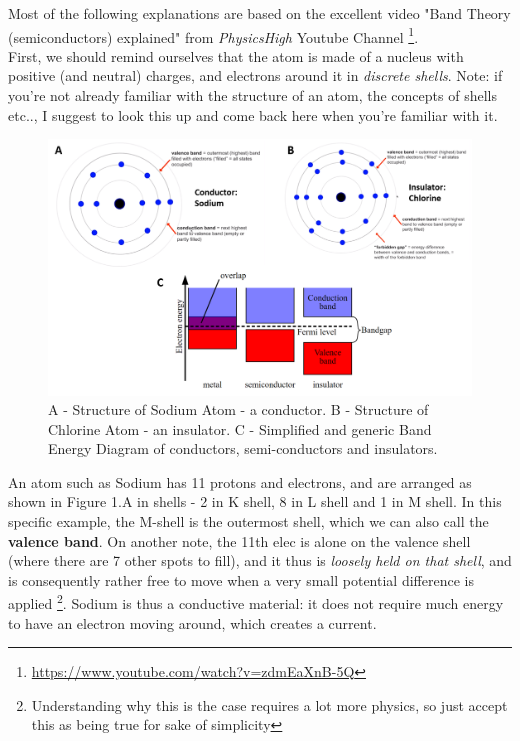 Most of the following explanations are based on the excellent video "Band Theory (semiconductors) explained" from \textit{PhysicsHigh} Youtube Channel \footnote{\url{https://www.youtube.com/watch?v=zdmEaXnB-5Q}}. \\ 

First, we should remind ourselves that the atom is made of a nucleus with positive (and neutral) charges, and electrons around it in \textit{discrete shells}. Note: if you're not already familiar with the structure of an atom, the concepts of shells etc.., I suggest to look this up and come back here when you're familiar with it.

\begin{figure}[H]
    \centering
    \includegraphics[width=0.95\linewidth]{../../Figures/Conduction_Energy_Band_Diagrams.PNG}
    \caption{A - Structure of Sodium Atom - a conductor. B - Structure of Chlorine Atom - an insulator. C - Simplified and generic Band Energy Diagram of conductors, semi-conductors and insulators.}
    \label{fig:Conduction}
\end{figure}

An atom such as Sodium has 11 protons and electrons, and are arranged as shown in Figure 1.A in shells - 2 in K shell, 8 in L shell and 1 in M shell.  In this specific example, the M-shell is the outermost shell, which we can also call the \textbf{valence band}. On another note, the 11th elec is alone on the valence shell (where there are 7 other spots to fill), and it thus is \textit{loosely held on that shell}, and is consequently rather free to move when a very small potential difference is applied \footnote{Understanding why this is the case requires a lot more physics, so just accept this as being true for sake of simplicity}. Sodium is thus a conductive material: it does not require much energy to have an electron moving around, which creates a current.

